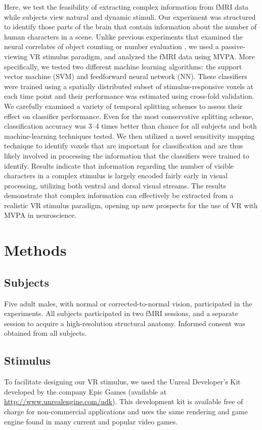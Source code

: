 \documentclass[review,1p,authoryear]{elsarticle}
\begin{document}
Here, we test the feasibility of extracting complex information from fMRI data while subjects view natural and dynamic stimuli.
Our experiment was structured to identify those parts of the brain that contain information about the number of human characters in a scene.
Unlike previous experiments that examined the neural correlates of object counting or number evaluation \citep{Dehaene1999,Rickard2000,Barth2006}, we used a passive-viewing VR stimulus paradigm, and analyzed the fMRI data using MVPA.
More specifically, we tested two different machine learning algorithms: the support vector machine (SVM) and feedforward neural network (NN).
These classifiers were trained using a spatially distributed subset of stimulus-responsive voxels at each time point and their performance was estimated using cross-fold validation. 
We carefully examined a variety of temporal splitting schemes to assess their effect on classifier performance.
Even for the most conservative splitting scheme, classification accuracy was 3--4 times better than chance for all subjects and both machine-learning techniques tested.
We then utilized a novel sensitivity mapping technique to identify voxels that are important for classification and are thus likely involved in processing the information that the classifiers were trained to identify.
Results indicate that information regarding  the number of visible characters in a complex stimulus is largely encoded fairly early in visual processing, utilizing both ventral and dorsal visual streams.
The results demonstrate that complex information can effectively be extracted from a realistic VR stimulus paradigm, opening up new prospects for the use of VR with MVPA in neuroscience.

\section{Methods}

\subsection{Subjects}
Five adult males, with normal or corrected-to-normal vision, participated in the experiments. 
All subjects participated in two fMRI sessions, and a separate session to acquire a high-resolution structural anatomy. 
Informed consent was obtained from all subjects.

\subsection{Stimulus}
To facilitate designing our VR stimulus, we used the Unreal Developer's Kit developed by the company Epic Games (available at \url{http://www.unrealengine.com/udk}).
This development kit is available free of charge for non-commercial applications and uses the same rendering and game engine found in many current and popular video games.
\end{document}
